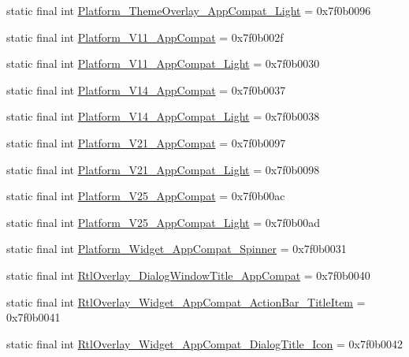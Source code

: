 \begin{CompactItemize}
\item 
static final int \hyperlink{classandroid_1_1support_1_1v4_1_1_r_1_1style_a6fc45cbd95f531bbe362470d62a6826}{Platform\_\-ThemeOverlay\_\-AppCompat\_\-Light} = 0x7f0b0096
\item 
static final int \hyperlink{classandroid_1_1support_1_1v4_1_1_r_1_1style_a7fd2b301a20d63c1d3ae7e979f3f4f7}{Platform\_\-V11\_\-AppCompat} = 0x7f0b002f
\item 
static final int \hyperlink{classandroid_1_1support_1_1v4_1_1_r_1_1style_0452355015e0b83a6514ed96f6976e7c}{Platform\_\-V11\_\-AppCompat\_\-Light} = 0x7f0b0030
\item 
static final int \hyperlink{classandroid_1_1support_1_1v4_1_1_r_1_1style_eca419c6a8ce52bfae1166b8b7ddeb1a}{Platform\_\-V14\_\-AppCompat} = 0x7f0b0037
\item 
static final int \hyperlink{classandroid_1_1support_1_1v4_1_1_r_1_1style_2f8d515f3c002b6d794e594075e79c8d}{Platform\_\-V14\_\-AppCompat\_\-Light} = 0x7f0b0038
\item 
static final int \hyperlink{classandroid_1_1support_1_1v4_1_1_r_1_1style_83b503e2307ed2a2e943932cb5b94932}{Platform\_\-V21\_\-AppCompat} = 0x7f0b0097
\item 
static final int \hyperlink{classandroid_1_1support_1_1v4_1_1_r_1_1style_75dff81b5a11a1433a4ae1ac18eeb1f0}{Platform\_\-V21\_\-AppCompat\_\-Light} = 0x7f0b0098
\item 
static final int \hyperlink{classandroid_1_1support_1_1v4_1_1_r_1_1style_e7dbe0d645a8b6a95ece60013073fc14}{Platform\_\-V25\_\-AppCompat} = 0x7f0b00ac
\item 
static final int \hyperlink{classandroid_1_1support_1_1v4_1_1_r_1_1style_b8029387bc23d3c16da96b60658c2a4f}{Platform\_\-V25\_\-AppCompat\_\-Light} = 0x7f0b00ad
\item 
static final int \hyperlink{classandroid_1_1support_1_1v4_1_1_r_1_1style_cb082a57b8e54ff30a3b0bc7559362da}{Platform\_\-Widget\_\-AppCompat\_\-Spinner} = 0x7f0b0031
\item 
static final int \hyperlink{classandroid_1_1support_1_1v4_1_1_r_1_1style_9f52cbb7c8e5fce9b905920452e61af1}{RtlOverlay\_\-DialogWindowTitle\_\-AppCompat} = 0x7f0b0040
\item 
static final int \hyperlink{classandroid_1_1support_1_1v4_1_1_r_1_1style_6edc5cd24367cbb2f91a8018e16a96f7}{RtlOverlay\_\-Widget\_\-AppCompat\_\-ActionBar\_\-TitleItem} = 0x7f0b0041
\item 
static final int \hyperlink{classandroid_1_1support_1_1v4_1_1_r_1_1style_fdf3f6fefec521a165f876ede5bd7a23}{RtlOverlay\_\-Widget\_\-AppCompat\_\-DialogTitle\_\-Icon} = 0x7f0b0042

\end{CompactItemize}
